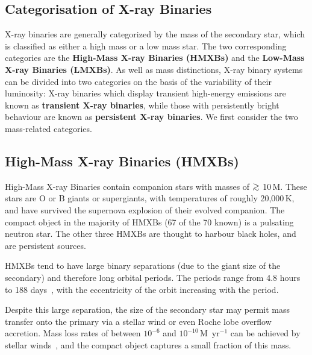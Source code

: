 
\subsection{Categorisation of X-ray Binaries}\label{cha:Introduction:sec:X-rayBinaries:subsec:CategorizationOfX-rayBinaries}

X-ray binaries are generally categorized by the mass of the
secondary star, which is classified as either a high mass or a low
mass star. The two corresponding categories are the \textbf{High-Mass
X-ray Binaries (HMXBs)} and the \textbf{Low-Mass X-ray Binaries (LMXBs)}. %
As well as mass distinctions, X-ray binary systems can be divided into
two categories on the basis of the variability of their luminosity: %
X-ray binaries which display transient high-energy emissions are known as
\textbf{transient X-ray binaries}, while those with persistently bright behaviour are known as
\textbf{persistent X-ray binaries}. We first consider the two mass-related categories. %


\subsection{High-Mass X-ray Binaries (HMXBs)}\label{cha:Introduction:sec:X-rayBinaries:subsec:HMXBs}

High-Mass X-ray Binaries contain companion stars with masses of $\gsim$
10\,M\sun. These stars are O or B giants or supergiants, %
with temperatures of roughly 20,000\,K, %
and have survived the supernova explosion of their evolved
companion. %
The compact object in the majority of HMXBs (67 of the 70 known) is a pulsating neutron
star.
The other three HMXBs are thought to harbour black holes, and are persistent sources. %

\vspace{\myparskip}

HMXBs tend to have large binary separations (due to the giant size of
the secondary) and therefore long orbital periods. The periods range from 4.8 hours to 188 days~\cite{VanParadijs:1995},
with the eccentricity of the orbit increasing with the period. %

\vspace{\myparskip}

Despite this large separation, the size of the secondary star may
permit mass transfer onto the primary via a stellar wind or even Roche lobe
overflow accretion. %
Mass loss rates of between $10^{-6}$ and $10^{-10}$\,M\sun\ $\mathrm{yr}^{-1}$ can be
achieved by stellar winds~\cite{WhiteNagaseParmar:1995}, %
and the compact object captures a small fraction of this mass. %

